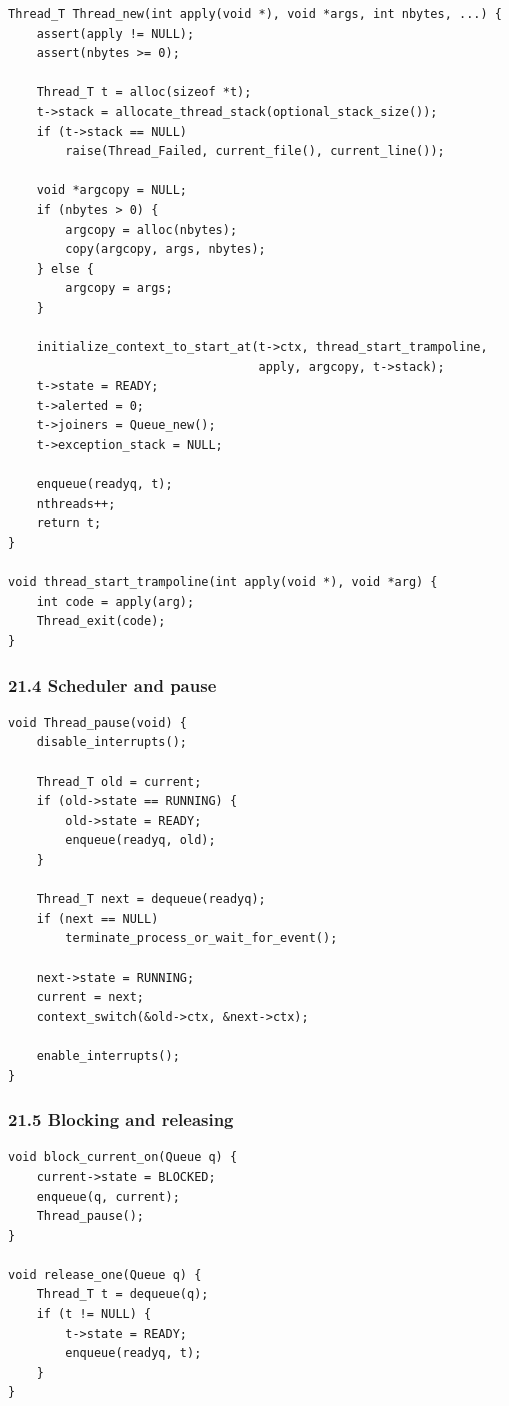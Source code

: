 \documentclass[11pt]{article}
\begin{document}
\begin{verbatim}
Thread_T Thread_new(int apply(void *), void *args, int nbytes, ...) {
    assert(apply != NULL);
    assert(nbytes >= 0);

    Thread_T t = alloc(sizeof *t);
    t->stack = allocate_thread_stack(optional_stack_size());
    if (t->stack == NULL)
        raise(Thread_Failed, current_file(), current_line());

    void *argcopy = NULL;
    if (nbytes > 0) {
        argcopy = alloc(nbytes);
        copy(argcopy, args, nbytes);
    } else {
        argcopy = args;
    }

    initialize_context_to_start_at(t->ctx, thread_start_trampoline,
                                   apply, argcopy, t->stack);
    t->state = READY;
    t->alerted = 0;
    t->joiners = Queue_new();
    t->exception_stack = NULL;

    enqueue(readyq, t);
    nthreads++;
    return t;
}

void thread_start_trampoline(int apply(void *), void *arg) {
    int code = apply(arg);
    Thread_exit(code);
}
\end{verbatim}

\subsubsection{21.4 Scheduler and pause}\label{scheduler-and-pause}

\begin{verbatim}
void Thread_pause(void) {
    disable_interrupts();

    Thread_T old = current;
    if (old->state == RUNNING) {
        old->state = READY;
        enqueue(readyq, old);
    }

    Thread_T next = dequeue(readyq);
    if (next == NULL)
        terminate_process_or_wait_for_event();

    next->state = RUNNING;
    current = next;
    context_switch(&old->ctx, &next->ctx);

    enable_interrupts();
}
\end{verbatim}

\subsubsection{21.5 Blocking and releasing}\label{blocking-and-releasing}

\begin{verbatim}
void block_current_on(Queue q) {
    current->state = BLOCKED;
    enqueue(q, current);
    Thread_pause();
}

void release_one(Queue q) {
    Thread_T t = dequeue(q);
    if (t != NULL) {
        t->state = READY;
        enqueue(readyq, t);
    }
}
\end{verbatim}
\end{document}

